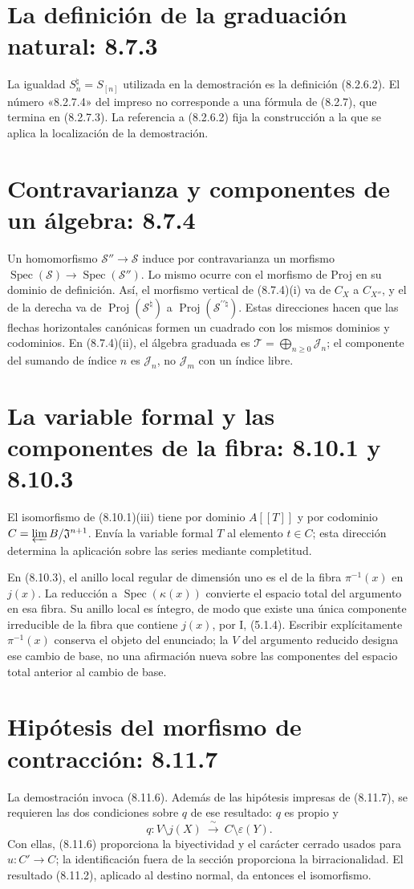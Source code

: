 \documentclass[11pt,a4paper]{article}
\DeclareMathOperator{\Spec}{Spec}
\DeclareMathOperator{\Proj}{Proj}
\begin{document}
\section{La definición de la graduación natural: 8.7.3}
La igualdad $S_n^\natural=S_{[n]}$ utilizada en la demostración
es la definición (8.2.6.2). El número «8.2.7.4» del impreso no
corresponde a una fórmula de (8.2.7), que termina en (8.2.7.3).
La referencia a (8.2.6.2) fija la construcción a la que se aplica
la localización de la demostración.

\section{Contravarianza y componentes de un álgebra: 8.7.4}
Un homomorfismo $\mathcal S''\to\mathcal S$ induce por
contravarianza un morfismo
$\Spec(\mathcal S)\to\Spec(\mathcal S'')$.
Lo mismo ocurre con el morfismo de Proj en su dominio de definición.
Así, el morfismo vertical de (8.7.4)(i) va de $C_X$ a $C_{X''}$,
y el de la derecha va de $\Proj(\mathcal S^\natural)$ a
$\Proj(\mathcal S^{\prime\prime\natural})$.
Estas direcciones hacen que las flechas horizontales canónicas
formen un cuadrado con los mismos dominios y codominios.
En (8.7.4)(ii), el álgebra graduada es
$\mathcal T=\bigoplus_{n\geq0}\mathcal J_n$; el componente del
sumando de índice $n$ es $\mathcal J_n$, no $\mathcal J_m$ con
un índice libre.

\section{La variable formal y las componentes de la fibra: 8.10.1 y 8.10.3}
El isomorfismo de (8.10.1)(iii) tiene por dominio $A[[T]]$ y por
codominio $C=\varprojlim B/\mathfrak J^{n+1}$.
Envía la variable formal $T$ al elemento $t\in C$; esta dirección
determina la aplicación sobre las series mediante completitud.

En (8.10.3), el anillo local regular de dimensión uno es el de la
fibra $\pi^{-1}(x)$ en $j(x)$. La reducción a
$\Spec(\kappa(x))$ convierte el espacio total del argumento en esa
fibra. Su anillo local es íntegro, de modo que existe una única
componente irreducible de la fibra que contiene $j(x)$, por I,
(5.1.4). Escribir explícitamente $\pi^{-1}(x)$ conserva el objeto
del enunciado; la $V$ del argumento reducido designa ese cambio
de base, no una afirmación nueva sobre las componentes del espacio
total anterior al cambio de base.

\section{Hipótesis del morfismo de contracción: 8.11.7}
La demostración invoca (8.11.6). Además de las hipótesis impresas
de (8.11.7), se requieren las dos condiciones sobre $q$ de ese
resultado: $q$ es propio y
\[
q:V\setminus j(X)\ \xrightarrow{\ \sim\ }\
       C\setminus\varepsilon(Y).
\]
Con ellas, (8.11.6) proporciona la biyectividad y el carácter
cerrado usados para $u:C'\to C$; la identificación fuera de la
sección proporciona la birracionalidad. El resultado (8.11.2),
aplicado al destino normal, da entonces el isomorfismo.
\end{document}
